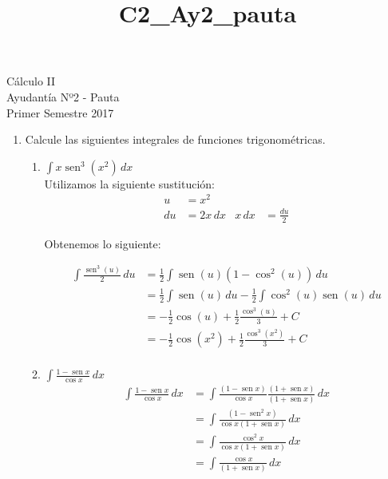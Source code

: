 \documentclass[a4paper,10pt]{article}
\title{C2_Ay2_pauta}
\newcommand{\dis}{\displaystyle}
\def\sin{\operatorname{sen}}
\begin{document}
\begin{center}
Cálculo II\\
Ayudantía Nº2 - Pauta\\
Primer Semestre 2017
\end{center}


\begin{enumerate}


\item Calcule las siguientes integrales de funciones
trigonom\'{e}tricas.
\begin{enumerate}[label=\emph{\alph*)}]
\item $\dis \int x\sin^3(x^2)\, dx$\\

Utilizamos la siguiente sustitución:
\begin{align*}
 u  &=  x^2  &    \\
 du &= 2x  \, dx     &   x \, dx &= \frac{du}{2}
\end{align*}
\dotfill [1 punto]


Obtenemos lo siguiente:



\begin{align*}
 \int \frac{\sin^3(u)}{2} \, du  &=  \frac{1}{2} \int \sin(u)(1-\cos^2(u)) \, du\\
							     &=  \frac{1}{2} \int \sin(u) \, du - \frac{1}{2} \int \cos^2(u)\sin(u) \, du  \\
                                 &=  - \frac{1}{2}  \cos(u)  + \frac{1}{2} \frac{\cos^3(u)}{3} + C   \\
                                 &=  - \frac{1}{2}  \cos(x^2)  + \frac{1}{2} \frac{\cos^3(x^2)}{3} + C   \\
\end{align*}
\dotfill [1 punto]

\newpage
\item $\dis \int \frac{1-\sin x}{\cos x}\, dx$\\



\begin{align*}
 \dis \int \frac{1-\sin x}{\cos x}\, dx  &=    \int \frac{(1-\sin x)}{\cos x}\frac{(1+\sin x)}{(1+\sin x)}  \, dx\\
 										 &=    \int \frac{(1-\sin^2 x)}{\cos x(1+\sin x)}  \, dx\\
                                         &=    \int \frac{\cos^2 x}{\cos x(1+\sin x)}  \, dx\\
                                         &=    \int \frac{\cos x}{(1+\sin x)}  \, dx\\
\end{align*}



\end{enumerate}
\end{enumerate}
\end{document}

